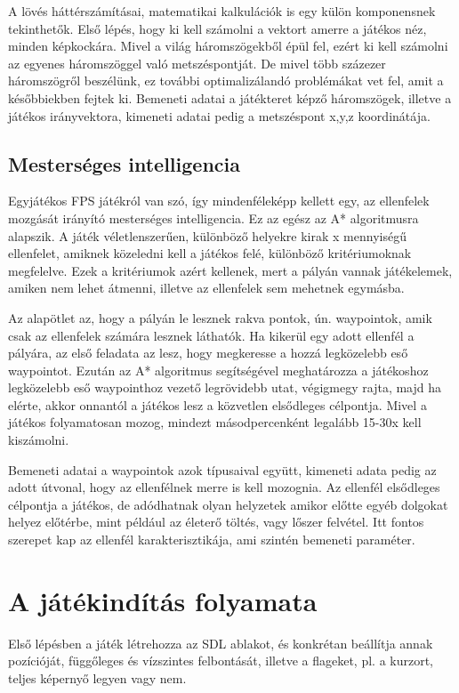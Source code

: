 A lövés háttérszámításai, matematikai kalkulációk is egy külön komponensnek tekinthetők. Első lépés, hogy ki kell számolni a vektort amerre a játékos néz, minden képkockára. Mivel a világ háromszögekből épül fel, ezért ki kell számolni az egyenes háromszöggel való metszéspontját. De mivel több százezer háromszögről beszélünk, ez további optimalizálandó problémákat vet fel, amit a későbbiekben fejtek ki. Bemeneti adatai a játékteret képző háromszögek, illetve a játékos irányvektora, kimeneti adatai pedig a metszéspont x,y,z koordinátája.

\subsection{Mesterséges intelligencia}

Egyjátékos FPS játékról van szó, így mindenféleképp kellett egy, az ellenfelek mozgását irányító mesterséges intelligencia. Ez az egész az A* algoritmusra alapszik. A játék véletlenszerűen, különböző helyekre kirak x mennyiségű ellenfelet, amiknek közeledni kell a játékos felé, különböző kritériumoknak megfelelve. Ezek a kritériumok azért kellenek, mert a pályán vannak játékelemek, amiken nem lehet átmenni, illetve az ellenfelek sem mehetnek egymásba. 

Az alapötlet az, hogy a pályán le lesznek rakva pontok, ún. waypointok, amik csak az ellenfelek számára lesznek láthatók. Ha kikerül egy adott ellenfél a pályára, az első feladata az lesz, hogy megkeresse a hozzá legközelebb eső waypointot. Ezután az A* algoritmus segítségével meghatározza a játékoshoz legközelebb eső waypointhoz vezető legrövidebb utat, végigmegy rajta, majd ha elérte, akkor onnantól a játékos lesz a közvetlen elsődleges célpontja. Mivel a játékos folyamatosan mozog, mindezt másodpercenként legalább 15-30x kell kiszámolni.

Bemeneti adatai a waypointok azok típusaival együtt, kimeneti adata pedig az adott útvonal, hogy az ellenfélnek merre is kell mozognia. Az ellenfél elsődleges célpontja a játékos, de adódhatnak olyan helyzetek amikor előtte egyéb dolgokat helyez előtérbe, mint például az életerő töltés, vagy lőszer felvétel. Itt fontos szerepet kap az ellenfél karakterisztikája, ami szintén bemeneti paraméter.


\section{A játékindítás folyamata}

Első lépésben a játék létrehozza az SDL ablakot, és konkrétan beállítja annak pozícióját, függőleges és vízszintes felbontását, illetve a flageket, pl. a kurzort, teljes képernyő legyen vagy nem.

